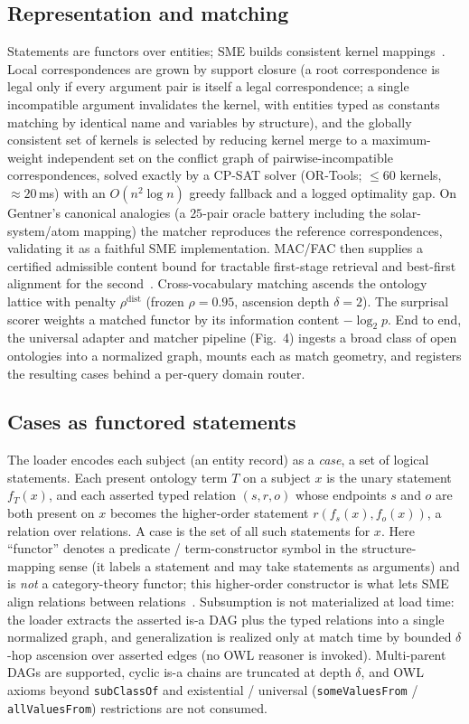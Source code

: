\documentclass[pdflatex,sn-nature]{sn-jnl}
\begin{document}
\subsection{Representation and matching}
 Statements are functors over entities; SME
builds consistent kernel mappings~\cite{falkenhainer1989sme}. Local
correspondences are grown by support closure (a root correspondence is legal only
if every argument pair is itself a legal correspondence; a single incompatible
argument invalidates the kernel, with entities typed as constants matching by
identical name and variables by structure), and the globally consistent set of
kernels is selected by reducing kernel merge to a maximum-weight independent set on
the conflict graph of pairwise-incompatible correspondences, solved exactly by a
CP-SAT solver (OR-Tools; $\le 60$ kernels, $\approx 20$\,ms) with an
$O(n^2\log n)$ greedy fallback and a logged optimality gap. On Gentner's canonical
analogies (a $25$-pair oracle battery including the solar-system/atom mapping) the
matcher reproduces the reference correspondences, validating it as a faithful SME
implementation. MAC/FAC then supplies a certified admissible content bound for
tractable first-stage retrieval and best-first alignment for the
second~\cite{forbus1995macfac}. Cross-vocabulary
matching ascends the ontology lattice with penalty $\rho^{\mathrm{dist}}$ (frozen
$\rho{=}0.95$, ascension depth $\delta{=}2$). The surprisal scorer weights a
matched functor by its information content $-\log_2 p$. End to end, the universal
adapter and matcher pipeline (Fig.~4) ingests a broad class of open ontologies into
a normalized graph, mounts each as match geometry, and registers the resulting
cases behind a per-query domain router.

\subsection{Cases as functored statements}
 The loader encodes each subject (an
entity record) as a \emph{case}, a set of logical statements. Each present
ontology term $T$ on a subject $x$ is the unary statement $f_T(x)$, and each
asserted typed relation $(s,r,o)$ whose endpoints $s$ and $o$ are both present
on $x$ becomes the higher-order statement $r\!\left(f_s(x),f_o(x)\right)$, a
relation over relations. A case is the set of all such statements for $x$. Here
``functor'' denotes a predicate / term-constructor symbol in the
structure-mapping sense (it labels a statement and may take statements as
arguments) and is \emph{not} a category-theory functor; this higher-order
constructor is what lets SME align relations between
relations~\cite{falkenhainer1989sme}. Subsumption is not materialized at load
time: the loader extracts the asserted is-a DAG plus the typed relations into a
single normalized graph, and generalization is realized only at match time by
bounded $\delta$-hop ascension over asserted edges (no OWL reasoner is invoked).
Multi-parent DAGs are supported, cyclic is-a chains are truncated at depth
$\delta$, and OWL axioms beyond \texttt{subClassOf} and existential / universal
(\texttt{someValuesFrom} / \texttt{allValuesFrom}) restrictions are not consumed.
\end{document}
